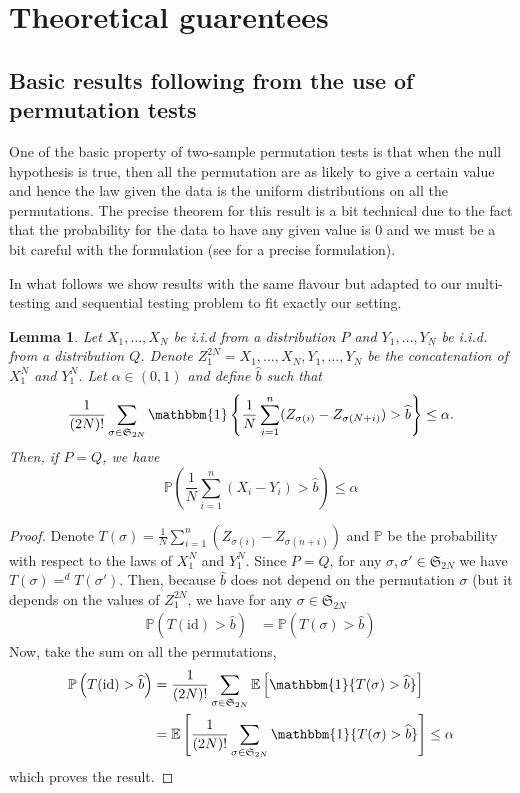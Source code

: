 \documentclass{article}
\theoremstyle{plain}
\newtheorem{Lemma}{Lemma}
\theoremstyle{remark}
\renewcommand{\P}{\mathbb{P}}
\newcommand{\E}{\mathbb{E}}
\renewcommand{\S}{\mathfrak{S}}
\newcommand{\1}{\mathbbm{1}}
\newcommand{\id}{\mathrm{id}}
\newcommand{\todoT}[1]{\todo[inline,color=blue!40]{{\textbf{T:}~}#1}}
\numberwithin{equation}{section}
\begin{document}
\newpage

\section{Theoretical guarentees}
\subsection{Basic results following from the use of permutation tests}
One of the basic property of two-sample permutation tests is that when the null hypothesis is true, then all the permutation are as likely to give a certain value and hence the law given the data is the uniform distributions on all the permutations. The precise theorem for this result is a bit technical due to the fact that the probability for the data to have any given value is $0$ and we must be a bit careful with the formulation (see \cite[Theorem 17.2.2]{lehmann2005testing} for a precise formulation). 

In what follows we show results with the same flavour but adapted to our multi-testing and sequential testing problem to fit exactly our setting.
\begin{Lemma}\label{lem:quantile_permu_2}
Let $X_1,\dots,X_N$ be i.i.d from a distribution $P$ and $Y_1,\dots,Y_N$ be i.i.d. from a distribution $Q$. Denote $Z_1^{2N}=X_1,\dots,X_N,Y_1,\dots,Y_N$ be the concatenation of $X_1^N$ and $Y_1^N$. Let $\alpha \in (0,1)$ and define $\widehat{b}$ such that 
$$ \frac{1}{(2N)!}\sum_{\sigma\in \S_{2N}} \1\left\{ \frac{1}{N}\sum_{i=1}^n (Z_{\sigma(i)}-Z_{\sigma(N+i)}) > \widehat{b}\right\}\le \alpha.$$
Then, if $P=Q$, we have 
$$\P\left(\frac{1}{N}\sum_{i=1}^n (X_i-Y_i) >\widehat{b} \right)\le \alpha $$ 
\end{Lemma}
\begin{proof}
Denote $T(\sigma)= \frac{1}{N}\sum_{i=1}^n (Z_{\sigma(i)}-Z_{\sigma(n+i)})$ and $\P$ be the probability with respect to the laws of $X_1^N$ and $Y_1^N$. Since $P=Q$, for any $\sigma,\sigma' \in \S_{2N}$ we have $T(\sigma)=^d T(\sigma')$. Then, because $\widehat{b}$ does not depend on the permutation $\sigma$ (but it depends on the values of $Z_1^{2N}$, we have for any $\sigma \in \S_{2N}$
\begin{align*}
\P\left(T(\id)> \widehat{b}\right)&=\P\left(T(\sigma)> \widehat{b}\right)
\end{align*} 
Now, take the sum on all the permutations, 
\begin{align*}
\P\left(T(\id)> \widehat{b}\right)&=\frac{1}{(2N)!}\sum_{\sigma\in \S_{2N}} \E\left[\1\{T(\sigma)> \widehat{b}\}\right]\\
&=  \E\left[\frac{1}{(2N)!}\sum_{\sigma\in \S_{2N}}\1\{T(\sigma)> \widehat{b}\}\right]\le \alpha
\end{align*}
which proves the result.
\end{proof}
\end{document}
